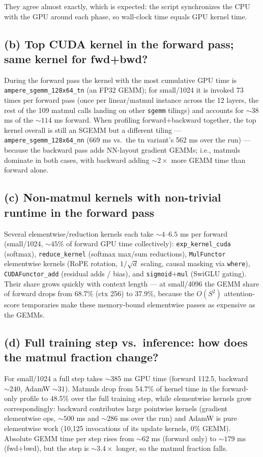 \documentclass[11pt]{article}
\newcommand{\code}[1]{\texttt{#1}}
\begin{document}
They agree almost exactly, which is expected: the script synchronizes the CPU with the GPU around
each phase, so wall-clock time equals GPU kernel time.

\subsection{(b) Top CUDA kernel in the forward pass; same kernel for fwd+bwd?}

During the forward pass the kernel with the most cumulative GPU time is
\code{ampere\_sgemm\_128x64\_tn} (an FP32 GEMM); for small/1024 it is invoked 73 times per forward
pass (once per linear/matmul instance across the 12 layers, the rest of the 109 matmul calls landing
on other \code{sgemm} tilings) and accounts for ${\sim}38$ ms of the ${\sim}114$ ms forward. When
profiling forward+backward together, the top kernel overall is still an SGEMM but a different tiling
--- \code{ampere\_sgemm\_128x64\_nn} (669 ms vs.\ the tn variant's 562 ms over the run) --- because
the backward pass adds NN-layout gradient GEMMs; i.e., matmuls dominate in both cases, with backward
adding ${\sim}2\times$ more GEMM time than forward alone.

\subsection{(c) Non-matmul kernels with non-trivial runtime in the forward pass}

Several elementwise/reduction kernels each take ${\sim}4$--$6.5$ ms per forward (small/1024,
${\sim}45\%$ of forward GPU time collectively): \code{exp\_kernel\_cuda} (softmax),
\code{reduce\_kernel} (softmax max/sum reductions), \code{MulFunctor} elementwise kernels (RoPE
rotation, $1/\sqrt{d}$ scaling, causal masking via \code{where}), \code{CUDAFunctor\_add} (residual
adds / bias), and \code{sigmoid}+\code{mul} (SwiGLU gating). Their share grows quickly with context
length --- at small/4096 the GEMM share of forward drops from 68.7\% (ctx 256) to 37.9\%, because the
$O(S^2)$ attention-score temporaries make these memory-bound elementwise passes as expensive as the
GEMMs.

\subsection{(d) Full training step vs.\ inference: how does the matmul fraction change?}

For small/1024 a full step takes ${\sim}385$ ms GPU time (forward 112.5, backward ${\sim}240$, AdamW
${\sim}31$). Matmuls drop from 54.7\% of kernel time in the forward-only profile to 48.5\% over the
full training step, while elementwise kernels grow correspondingly: backward contributes large
pointwise kernels (gradient elementwise ops, ${\sim}500$ ms and ${\sim}286$ ms over the run) and
AdamW is pure elementwise work (10,125 invocations of its update kernels, 0\% GEMM). Absolute GEMM
time per step rises from ${\sim}62$ ms (forward only) to ${\sim}179$ ms (fwd+bwd), but the step is
${\sim}3.4\times$ longer, so the matmul fraction falls.
\end{document}
